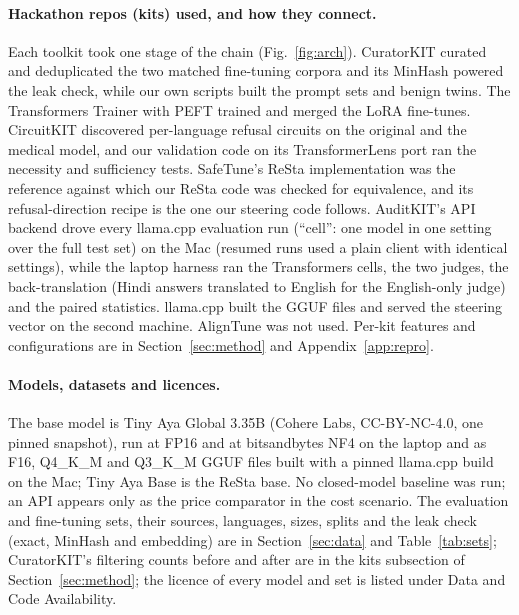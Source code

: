 \paragraph{Hackathon repos (kits) used, and how they connect.} Each toolkit took one stage of the chain (Fig.~\ref{fig:arch}). CuratorKIT curated and deduplicated the two matched fine-tuning corpora and its MinHash powered the leak check, while our own scripts built the prompt sets and benign twins. The Transformers Trainer with PEFT trained and merged the LoRA fine-tunes. CircuitKIT discovered per-language refusal circuits on the original and the medical model, and our validation code on its TransformerLens port ran the necessity and sufficiency tests. SafeTune's ReSta implementation was the reference against which our ReSta code was checked for equivalence, and its refusal-direction recipe is the one our steering code follows. AuditKIT's API backend drove every llama.cpp evaluation run (``cell'': one model in one setting over the full test set) on the Mac (resumed runs used a plain client with identical settings), while the laptop harness ran the Transformers cells, the two judges, the back-translation (Hindi answers translated to English for the English-only judge) and the paired statistics. llama.cpp built the GGUF files and served the steering vector on the second machine. AlignTune was not used. Per-kit features and configurations are in Section~\ref{sec:method} and Appendix~\ref{app:repro}.

\paragraph{Models, datasets and licences.} The base model is Tiny Aya Global 3.35B (Cohere Labs, CC-BY-NC-4.0, one pinned snapshot), run at FP16 and at bitsandbytes NF4 on the laptop and as F16, Q4\_K\_M and Q3\_K\_M GGUF files built with a pinned llama.cpp build on the Mac; Tiny Aya Base is the ReSta base. No closed-model baseline was run; an API appears only as the price comparator in the cost scenario. The evaluation and fine-tuning sets, their sources, languages, sizes, splits and the leak check (exact, MinHash and embedding) are in Section~\ref{sec:data} and Table~\ref{tab:sets}; CuratorKIT's filtering counts before and after are in the kits subsection of Section~\ref{sec:method}; the licence of every model and set is listed under Data and Code Availability.

